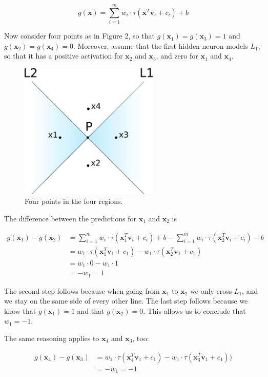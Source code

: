 \documentclass[
]{article}
\begin{document}
\[
g(\textbf{x})=\sum_{i=1}^m w_i\cdot \tau(\textbf{x}^T\textbf{v}_i+c_i)+b
\]

Now consider four points as in Figure 2, so that
\(g(\textbf{x}_1)=g(\textbf{x}_3)=1\) and
\(g(\textbf{x}_2)=g(\textbf{x}_4)=0\). Moreover, assume that the first
hidden neuron models \(L_1\), so that it has a positive activation for
\(\textbf{x}_2\) and \(\textbf{x}_3\), and zero for \(\textbf{x}_1\) and
\(\textbf{x}_4\).

\begin{figure}
\centering
\includegraphics[width=2.60417in,height=\textheight]{lab2f2.png}
\caption{Four points in the four regions.}
\end{figure}

The difference between the predictions for \(\textbf{x}_1\) and
\(\textbf{x}_2\) is

\begin{align*}
g(\textbf{x}_1)-g(\textbf{x}_2)
&= \sum_{i=1}^m w_i\cdot \tau(\textbf{x}_1^T\textbf{v}_i+c_i)+b-\sum_{i=1}^m w_i\cdot \tau(\textbf{x}_2^T\textbf{v}_i+c_i)-b \\
&= w_1\cdot \tau(\textbf{x}_1^T\textbf{v}_1+c_1)-w_1\cdot \tau(\textbf{x}_2^T\textbf{v}_1+c_1) \\
& =w_1\cdot 0-w_1\cdot 1 \\
&= -w_1 = 1
\end{align*}

The second step follows because when going from \(\textbf{x}_1\) to
\(\textbf{x}_2\) we only cross \(L_1\), and we stay on the same side of
every other line. The last step follows because we know that
\(g(\textbf{x}_1)=1\) and that \(g(\textbf{x}_2)=0\). This allows us to
conclude that \(w_1=-1\).

The same reasoning applies to \(\textbf{x}_4\) and \(\textbf{x}_3\),
too:

\begin{align*}
g(\textbf{x}_4)-g(\textbf{x}_3)
&=w_1\cdot \tau(\textbf{x}_4^T\textbf{v}_1+c_1)-w_1\cdot \tau(\textbf{x}_3^T\textbf{v}_1+c_1)) \\
&=-w_1 =-1
\end{align*}
\end{document}
